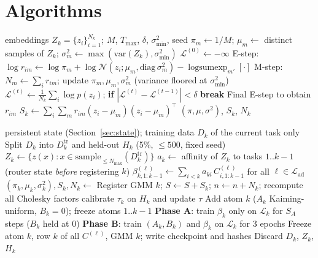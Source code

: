 \documentclass[11pt]{article}
\newcommand{\T}{^{\top}}
\newcommand{\Ladapt}{\mathcal{L}_{\mathrm{ad}}}
\begin{document}
\section{Algorithms}

\begin{algorithm}[h]
\caption{\textsc{FitTaskGMM}: diagonal EM and within-task scatter (thesis Algorithm~1 plus scatter)}\label{alg:em}
\begin{algorithmic}[1]
\Require embeddings $Z_k=\{z_i\}_{i=1}^{N_k}$; $M$, $T_{\max}$, $\delta$, $\sigma^2_{\min}$, seed
\State $\pi_m\gets 1/M$; $\mu_m\gets$ distinct samples of $Z_k$; $\sigma^2_m\gets\max(\mathrm{var}(Z_k),\sigma^2_{\min})$
\State $\mathcal{L}^{(0)}\gets-\infty$
  \State E-step: $\log r_{im}\gets\log\pi_m+\log\mathcal N(z_i;\mu_m,\mathrm{diag}\,\sigma^2_m)-\operatorname{logsumexp}_{m'}[\cdot]$
  \State M-step: $N_m\gets\sum_i r_{im}$; update $\pi_m,\mu_m,\sigma^2_m$ (variance floored at $\sigma^2_{\min}$)
  \State $\mathcal{L}^{(t)}\gets\frac{1}{N_k}\sum_i\log p(z_i)$; \textbf{if} $|\mathcal{L}^{(t)}-\mathcal{L}^{(t-1)}|<\delta$ \textbf{break}
\EndFor
\State Final E-step to obtain $r_{im}$
\State $S_k\gets\sum_i\sum_m r_{im}(z_i-\mu_m)(z_i-\mu_m)\T$ 
\State \Return $(\pi,\mu,\sigma^2)$, $S_k$, $N_k$
\end{algorithmic}
\end{algorithm}

\begin{algorithm}[h]
\caption{\textsc{LearnTask}$(k, D_k)$}\label{alg:learn}
\begin{algorithmic}[1]
\Require persistent state (Section~\ref{sec:state}); training data $D_k$ of the current task only
\State Split $D_k$ into $D_k^{\mathrm{tr}}$ and held-out $H_k$ (5\%, $\le 500$, fixed seed)
\State $Z_k\gets\{z(x): x\in\text{sample}_{\le N_{\max}}(D_k^{\mathrm{tr}})\}$ 
  \State $a_k\gets$ affinity of $Z_k$ to tasks $1..k-1$ (router state \emph{before} registering $k$)
  \State $\beta^{(\ell)}_{k,1:k-1}\gets\sum_{i<k}a_{ki}\,C^{(\ell)}_{i,1:k-1}$ for all $\ell\in\Ladapt$
\EndIf
\State $(\pi_k,\mu_k,\sigma^2_k),S_k,N_k\gets$ 
\State Register GMM $k$; $S\gets S+S_k$; $n\gets n+N_k$; recompute all Cholesky factors
 calibrate $\tau_k$ on $H_k$ and update $\tau$ \EndIf
\State Add atom $k$ ($A_k$ Kaiming-uniform, $B_k=0$); freeze atoms $1..k-1$
 \textbf{Phase A}: train $\beta_k$ only on $\mathcal L_k$ for $S_A$ steps ($B_k$ held at 0) \EndIf
\State \textbf{Phase B}: train $(A_k,B_k)$ and $\beta_k$ on $\mathcal L_k$ for 3 epochs
\State Freeze atom $k$, row $k$ of all $C^{(\ell)}$, GMM $k$; write checkpoint and hashes
\State Discard $D_k$, $Z_k$, $H_k$ 
\end{algorithmic}
\end{algorithm}
\end{document}
